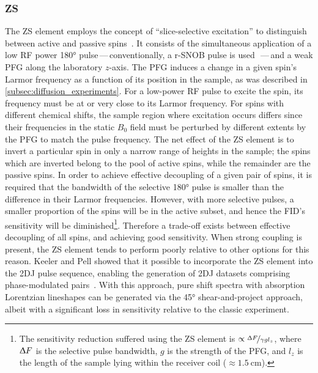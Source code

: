 \subsubsection{\ac{ZS}}
\label{subsec:ZS}
The \ac{ZS} element employs the concept of ``slice-selective excitation'' to
distinguish between active and passive spins~\cite{Zangger1997,Aguilar2010}. It
consists of the simultaneous application of a low \ac{RF} power \ang{180}
pulse\,---\,conventionally, a r-SNOB pulse is used~\cite{Kupce1995}\,---\,and a
weak \ac{PFG} along the laboratory $z$-axis.
The \ac{PFG} induces a change in a given spin's Larmor frequency as a
function of its position in the sample, as was described in
\cref{subsec:diffusion_experiments}. For a low-power \ac{RF} pulse to excite
the spin, its frequency must be at or very close to its Larmor
frequency.
For spins with different chemical shifts, the sample region where
excitation occurs differs since their frequencies in the static $B_0$ field
must be perturbed by different extents by the \ac{PFG} to match the pulse frequency.
The net effect of the \ac{ZS} element is to invert a particular spin in only a
narrow range of heights in the sample; the spins which are inverted belong to
the pool of active spins, while the remainder are the passive spins.
In order to achieve effective decoupling of a given pair of spins, it is required
that the bandwidth of the selective \ang{180} pulse is smaller than the
difference in their Larmor frequencies. However, with more selective pulses,
a smaller proportion of the spins will be in the active subset, and hence the
\ac{FID}'s sensitivity will be diminished\footnote{
    The sensitivity reduction suffered using the \ac{ZS} element is $\propto
    \nicefrac{\Updelta F}{\gamma g l_z}$, where $\Updelta F$ is the selective
    pulse bandwidth, $g$ is the strength of the \ac{PFG}, and $l_z$ is the
    length of the sample lying within the receiver coil ($\approx
    \qty{1.5}{\centi\meter}$).
}.
Therefore a trade-off exists between effective decoupling of all spins, and
achieving good sensitivity. When strong coupling is present,
the \ac{ZS} element tends to perform poorly relative to other options for this
reason. Keeler and Pell showed that it possible to incorporate the \ac{ZS}
element into the \ac{2DJ} pulse sequence, enabling the generation of \ac{2DJ}
datasets comprising phase-modulated pairs~\cite{Pell2007}. With this approach,
pure shift spectra with absorption Lorentzian lineshapes can be
generated via the \ang{45} shear-and-project approach, albeit with a
significant loss in sensitivity relative to the classic experiment.

